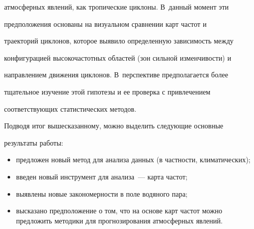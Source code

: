атмосферных явлений, как тропические циклоны. В~данный момент эти

предположения основаны на визуальном сравнении карт частот и

траекторий циклонов, которое выявило определенную зависимость между

конфигурацией высокочастотных областей (зон сильной изменчивости) и

направлением движения циклонов. В~перспективе предполагается более

тщательное изучение этой гипотезы и ее проверка с привлечением

соответствующих статистических методов.



\medskip



Подводя итог вышесказанному, можно выделить следующие основные

результаты работы:

\begin{itemize}

  \item   предложен новый метод для анализа данных (в частности, климатических);

  \item   введен новый инструмент для анализа~--- карта частот;

  \item   выявлены новые закономерности в поле водяного пара;

  \item   высказано предположение о том, что на основе карт частот можно предложить методики для прогнозирования атмосферных явлений.

\end{itemize}



